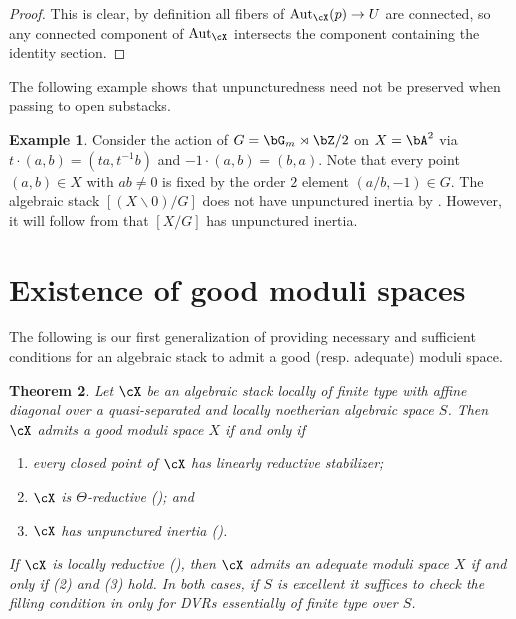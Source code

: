 \documentclass[a4paper]{amsart}
\numberwithin{equation}{section}
\theoremstyle{plain}
\newtheorem{thm}{Theorem}[section]
\theoremstyle{definition}
\newtheorem{example}[thm]{Example}
\DeclareMathOperator{\Aut}{Aut}
\begin{document}
\begin{proof}
	This is clear, by definition all fibers of $\Aut_{\cX}(p)\to U$ are connected, so any connected component of $\Aut_{\cX}$ intersects the component containing the identity section. 
\end{proof}
The following example shows that unpuncturedness need not be preserved when passing to open substacks.
\begin{example} \label{E:ex1}
	Consider the action of $G=\bG_m \rtimes \bZ/2$ on $X=\bA^2$ via $t \cdot (a, b) = (t a, t^{-1} b)$ and $ -1 \cdot (a, b) = (b, a)$.   Note that every point $(a,b) \in X$ with $ab \neq 0$ is fixed by the order $2$ element $(a/b,-1) \in G$.  
	The algebraic stack $[(X \smallsetminus 0) / G]$ does not have unpunctured inertia by .  However, it will follow from  that $[X/G]$ has unpunctured inertia.  
\end{example}


\section{Existence of good moduli spaces} \label{S:existence}
  
The following is our first generalization of  providing necessary and sufficient conditions for an algebraic stack to admit a good (resp. adequate) moduli space.

\begin{thm} \label{T:existence-general}
	Let $\cX$ be an algebraic stack locally of finite type with affine diagonal over a quasi-separated and locally noetherian algebraic space $S$.  Then $\cX$ admits a good moduli space $X$ if and only if 
	\begin{enumerate}
		\item every closed point of $\cX$ has linearly reductive stabilizer;
		\item $\cX$ is $\Theta$-reductive  (); and
		\item $\cX$ has unpunctured inertia ().
	\end{enumerate} 
	If $\cX$ is locally reductive (), then $\cX$ admits an adequate moduli space $X$ if and only if (2) and (3) hold. In both cases, if $S$ is excellent it suffices to check the filling condition in  only for DVRs essentially of finite type over $S$.
\end{thm}
\end{document}
